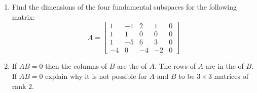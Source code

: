 \documentclass[10pt, a4paper]{article}
\theoremstyle{break}
\begin{document}
\begin{enumerate}
\item  Find the dimensions of the four fundamental subspaces for the following matrix:
\begin{equation}
A=
\begin{bmatrix}
1 & -1 & 2 &1 & 0 \\
1 & 1 & 0 & 0 & 0\\
1 & -5 & 6 & 3 & 0\\
-4 & 0 &-4 & -2 & 0
\end{bmatrix}
\end{equation}







\item If $AB=0$ then the columns of $B$ are the \underline{\hspace{1cm}} of $A$. The rows of $A$ are in the  \underline{\hspace{1cm}} of $B$. If $AB=0$ explain why it is not possible for $A$ and $B$ to be $3 \times 3$ matrices of rank 2. \\ \\








\end{enumerate}
\end{document}
